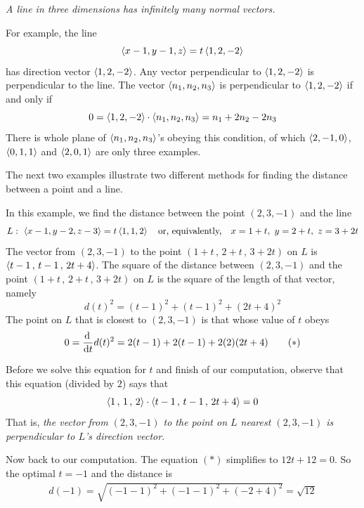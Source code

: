 \begin{warning}\label{warn line normal}
\emph{A line in three dimensions has infinitely many normal vectors.}

For example, the line
\begin{equation*}
\left< x-1,y-1,z\right>=t\left< 1,2,-2\right> 
\end{equation*}
has direction vector $\left< 1,2,-2\right>$. Any vector perpendicular to 
$\left< 1,2,-2\right> $
is perpendicular to the line. The vector $\left< n_1,n_2,n_3\right>$ is 
perpendicular to $\left< 1,2,-2\right>$ if and only if 
\begin{equation*}
0=\left< 1,2,-2\right> \cdot \left< n_1,n_2,n_3\right> = n_1+2n_2-2n_3
\end{equation*}
There is  whole plane of $\left< n_1,n_2,n_3\right>$'s obeying this condition,
of which $\left< 2,-1,0\right>$, $\left< 0,1,1\right>$ and $\left< 2,0,1\right>$ 
are only three examples.
\end{warning}

The next two examples illustrate two different methods for finding the distance between a point and a line.
\begin{eg}\label{eg:VPdistance-point-line}
In this example, we find the distance between the point $(2,3,-1)$ and the line
\begin{equation*}
L:\  \left< x-1,y-2,z-3\right>=t\left< 1,1,2\right> \quad \text{or, equivalently,}\quad 
x=1+t,\ y=2+t,\ z=3+2t
\end{equation*}
The vector from $(2,3,-1)$ to the point $(1+t\,,\,2+t\,,\,3+2t)$ on $L$ is
$%
\llt t-1\,,\,t-1\,,\,2t+4\rgt$.
The square of the distance between $(2,3,-1)$ and the point 
$(1+t\,,\,2+t\,,\,3+2t)$  on $L$ is the square of the length of that vector, namely
\begin{equation*}
d(t)^2 = (t-1)^2 +(t-1)^2 +(2t+4)^2
\end{equation*}
The point on $L$ that is closest to $(2,3,-1)$ is that whose value of $t$
obeys
\begin{align*}
0= \diff{}{t} d(t)^2 = 2(t-1) +2(t-1) + 2(2)(2t+4)
\tag{$*$}\end{align*}

Before we solve this equation for $t$ and finish of our computation, observe
that this equation (divided by $2$) says that
\begin{equation*}
\left< 1\,,\,1\,,\,2\right>\cdot\left< t-1\,,\,t-1\,,\, 2t+4\right> = 0
\end{equation*}
That is, \emph{the vector from $(2,3,-1)$ to the point on $L$ nearest $(2,3,-1)$
is perpendicular to $L$'s direction vector}.

Now back to our computation. The equation $(*)$ simplifies to $12t+12=0$.
So the optimal $t=-1$ and the distance is
\begin{align*}
d(-1) =\sqrt{(-1-1)^2+(-1-1)^2+(-2+4)^2}
=\sqrt{12}
\end{align*}

\end{eg}

